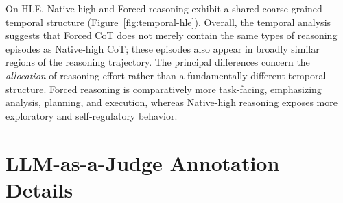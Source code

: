 
On HLE, Native-high and Forced reasoning exhibit a
shared coarse-grained temporal structure
(Figure~\ref{fig:temporal-hle}). Overall, the temporal analysis suggests that Forced CoT does not
merely contain the same types of reasoning episodes as Native-high
CoT; these episodes also appear in broadly similar regions of the
reasoning trajectory. The principal differences concern the
\emph{allocation} of reasoning effort rather than a fundamentally
different temporal structure. Forced reasoning is comparatively more
task-facing, emphasizing analysis, planning, and execution, whereas
Native-high reasoning exposes more exploratory and self-regulatory
behavior.








\section{LLM-as-a-Judge Annotation Details}
\label{app:llm_judge}

